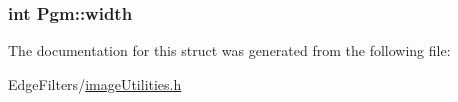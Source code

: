 \subsubsection[{width}]{\setlength{\rightskip}{0pt plus 5cm}int Pgm\+::width}\label{struct_pgm_a093d928bb493b2da54111430b9892431}


The documentation for this struct was generated from the following file\+:\begin{DoxyCompactItemize}
\item 
Edge\+Filters/\hyperlink{image_utilities_8h}{image\+Utilities.\+h}\end{DoxyCompactItemize}
